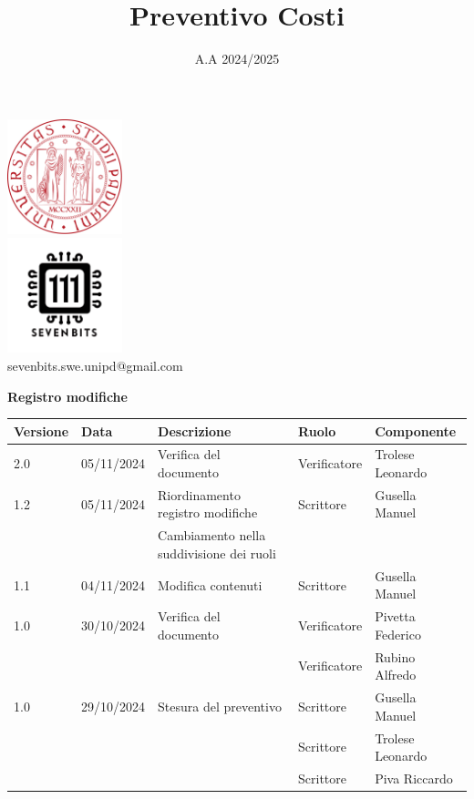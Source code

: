 \documentclass[10pt]{article}
\title{Preventivo Costi}
\date{A.A 2024/2025}
\begin{document}
\maketitle
\begin{center}
\includegraphics[width=0.25\textwidth]{LogoUnipd}\\
\includegraphics[width=0.25\textwidth]{Sevenbitslogo}\\
sevenbits.swe.unipd@gmail.com\\
\vspace{2mm}

\textbf{Registro modifiche}\\
\vspace{2mm}
\begin{tabular}{|l|l|l|l|l|}
\hline
\textbf{Versione} & \textbf{Data} & \textbf{Descrizione} & \textbf{Ruolo} & \textbf{Componente} \\
\hline
2.0 & 05/11/2024 & Verifica del documento & Verificatore & Trolese Leonardo\\
\hline
1.2 & 05/11/2024 & Riordinamento registro modifiche & Scrittore & Gusella Manuel\\
& & Cambiamento nella suddivisione dei ruoli& &\\ 
\hline
1.1 & 04/11/2024 & Modifica contenuti & Scrittore & Gusella Manuel\\
\hline
1.0 & 30/10/2024 & Verifica del documento & Verificatore & Pivetta Federico\\
& & & Verificatore & Rubino Alfredo\\
\hline
1.0 & 29/10/2024 & Stesura del preventivo & Scrittore & Gusella Manuel\\
& & & Scrittore & Trolese Leonardo\\
& & & Scrittore & Piva Riccardo\\
\hline
\end{tabular}
\end{center}
\newpage
\tableofcontents
\newpage
\end{document}
